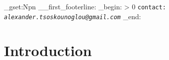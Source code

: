 \documentclass[a4paper,fleqn]{cas-dc}
\begin{document}
\sloppy
\maketitle
{}
\fussy

\ExplSyntaxOn
\cs_gset:Npn \__first_footerline:
{
    \group_begin:
    \small
    \sffamily
    \ifnum \theblind > 0 \relax
    \else
        \texttt{\MakeLowercase{Contact:}}~%
        {\rmfamily\itshape
            \texttt{\MakeLowercase{alexander.tsoskounoglou@gmail.com}}%
        }%
    \fi
    \group_end:
}
\ExplSyntaxOff

\section{Introduction}
\label{sec:introduction}
\end{document}
